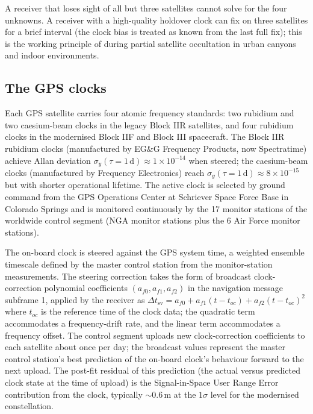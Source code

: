 A receiver that loses sight of all but three satellites cannot
solve for the four unknowns. A receiver with a high-quality
holdover clock can fix on three satellites for a brief interval
(the clock bias is treated as known from the last full fix); this
is the working principle of  during partial
satellite occultation in urban canyons and indoor environments.

\subsection{The GPS clocks}

Each GPS satellite carries four atomic frequency standards:
two rubidium and two caesium-beam clocks in the legacy Block IIR
satellites, and four rubidium clocks in the modernised Block
IIF and Block III spacecraft. The Block IIR rubidium clocks
(manufactured by EG\&G Frequency Products, now Spectratime) achieve
Allan deviation $\sigma_{y}(\tau = 1\,\si{\day}) \approx 1 \times
10^{-14}$ when steered; the caesium-beam clocks (manufactured by
Frequency Electronics) reach $\sigma_{y}(\tau = 1\,\si{\day})
\approx 8 \times 10^{-15}$ but with shorter operational lifetime.
The active clock is selected by ground command from the GPS
Operations Center at Schriever Space Force Base in Colorado
Springs and is monitored continuously by the 17 monitor stations
of the worldwide control segment (NGA monitor stations plus the
6 Air Force monitor stations).

The on-board clock is steered against the GPS system time, a
weighted ensemble timescale defined by the master control station
from the monitor-station measurements. The steering correction
takes the form of broadcast clock-correction polynomial
coefficients $(a_{f0}, a_{f1}, a_{f2})$ in the navigation message
subframe 1, applied by the receiver as
$\Delta t_{\text{sv}} = a_{f0} + a_{f1}(t - t_{oc}) + a_{f2}(t - t_{oc})^{2}$
where $t_{oc}$ is the reference time of the clock data; the
quadratic term accommodates a frequency-drift rate, and the
linear term accommodates a frequency offset. The control segment
uploads new clock-correction coefficients to each satellite about
once per day; the broadcast values represent the master control
station's best prediction of the on-board clock's behaviour
forward to the next upload. The post-fit residual of this
prediction (the actual versus predicted clock state at the time
of upload) is the Signal-in-Space User Range Error contribution
from the clock, typically $\sim 0.6\,\si{\meter}$ at the
$1\sigma$ level for the modernised constellation.


